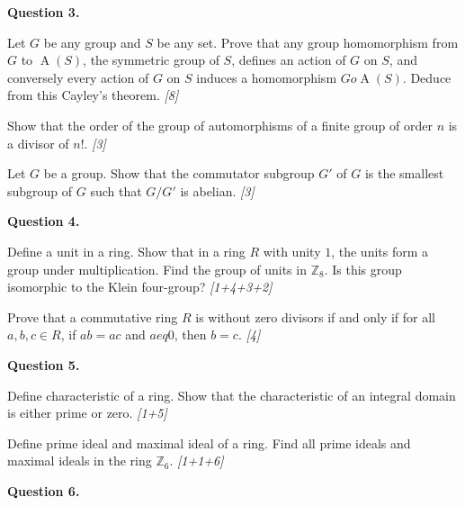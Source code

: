 \documentclass[11pt,a4paper]{article}
\newcommand{\pts}[1]{\hfill   \textit{[#1]}}
\begin{document}
\medskip


\noindent   \textbf{Question 3.}

\begin{parts}
  \item Let $G$ be any group and $S$ be any set. Prove that any group homomorphism from $G$ to $\operatorname{A}(S)$, the symmetric group of $S$, defines an action of $G$ on $S$, and conversely every action of $G$ on $S$ induces a homomorphism $G  o \operatorname{A}(S)$. Deduce from this Cayley's theorem. \pts{8}
  \item
  
\begin{parts}
    \item Show that the order of the group of automorphisms of a finite group of order $n$ is a divisor of $n!$. \pts{3}
    \item Let $G$ be a group. Show that the commutator subgroup $G'$ of $G$ is the smallest subgroup of $G$ such that $G/G'$ is abelian. \pts{3}
  \end{parts}
\end{parts}

\medskip


\noindent   \textbf{Question 4.}

\begin{parts}
  \item Define a unit in a ring. Show that in a ring $R$ with unity $1$, the units form a group under multiplication. Find the group of units in $\mathbb{Z}_8$. Is this group isomorphic to the Klein four-group? \pts{1+4+3+2}
  \item Prove that a commutative ring $R$ is without zero divisors if and only if for all $a, b, c \in R$, if $ab = ac$ and $a 
eq 0$, then $b = c$. \pts{4}
\end{parts}

\medskip


\noindent   \textbf{Question 5.}

\begin{parts}
  \item Define characteristic of a ring. Show that the characteristic of an integral domain is either prime or zero. \pts{1+5}
  \item Define prime ideal and maximal ideal of a ring. Find all prime ideals and maximal ideals in the ring $\mathbb{Z}_6$. \pts{1+1+6}
\end{parts}

\medskip


\noindent   \textbf{Question 6.}
\end{document}
